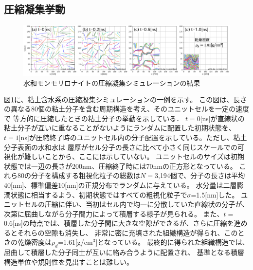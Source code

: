 ﻿\documentclass[11pt,a4j]{jarticle}
\begin{document}
\subsection{圧縮凝集挙動}
\begin{figure}[h]
	\begin{center}
	\includegraphics[width=1.0\linewidth]{Figs/revs.eps} 
	\end{center}
	\caption{水和モンモリロナイトの圧縮凝集シミュレーションの結果} 
	\label{fig:fig2}
\end{figure}
図\ref{fig:fig2}に、粘土含水系の圧縮凝集シミュレーションの一例を示す。
この図は、長さの異なる80個の粘土分子を含む周期構造を考え、そのユニットセルを一定の速度で
等方的に圧縮したときの粘土分子の挙動を示している．
$t=0$[ns]が直線状の粘土分子が互いに重なることがないようにランダムに配置した初期状態を、
$t=1$[ns]が圧縮終了時のユニットセル内の分子配置を示している。ただし、粘土分子表面の水和水は
層厚がセル分子の長さに比べて小さく同じスケールでの可視化が難しいことから、ここには示していない。
ユニットセルのサイズは初期状態では一辺の長さが200nm、圧縮終了時には70nmの正方形となっている。
これら80の分子を構成する粗視化粒子の総数は$N=$3,194個で、分子の長さは平均40[nm]、標準偏差10[nm]の正規分布でランダムに与えている。
水分量は二層膨潤状態に相当するよう、初期状態ではすべての粗視化粒子で$\sigma$=1.5[nm]した。
ユニットセルの圧縮に伴い、当初はセル内で均一に分散していた直線状の分子が、次第に屈曲しながら分子間力によって積層する様子が見られる。
また、$t=$0.6[ns]の時点では、積層した分子間に大きな空隙ができるが、さらに圧縮を進めるとそれらの空隙も消失し、
非常に密に充填された組織構造が得られ、このときの乾燥密度は$\rho_d$=1.61[g/cm$^3$]となっている。
最終的に得られた組織構造では、屈曲して積層した分子同士が互いに絡み合うように配置され、
基準となる積層構造単位や規則性を見出すことは難しい。
\end{document}
